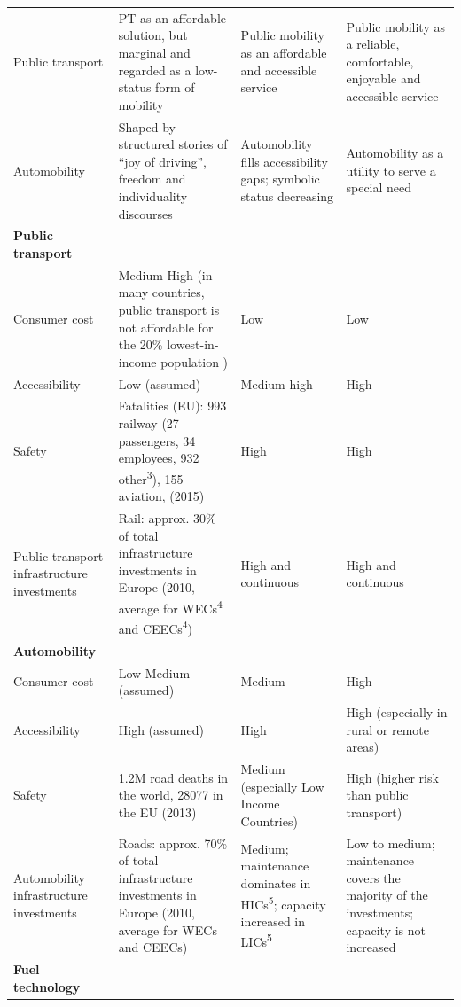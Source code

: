 \begin{longtable}{p{2.5cm}p{4.5cm}p{4cm}p{4cm}}
Public transport & PT as an affordable solution, but marginal and regarded as a low-status form of mobility & Public mobility as an affordable and accessible service & Public mobility as a reliable, comfortable, enjoyable and accessible service \\*
Automobility & Shaped by structured stories of ``joy of driving'', freedom and individuality discourses \parencite{gartman2004_ThreeAgesAutomobile,sheller2012_EmergenceNewCultures} & Automobility fills accessibility gaps; symbolic status decreasing & Automobility as a utility to serve a special need \\\addlinespace
\textbf{Public transport} &  &  &  \\*
Consumer cost & Medium-High (in many countries, public transport is not affordable for the 20\% lowest-in-income population \parencite{carruthers2005_AffordabilityPublicTransport}) & Low & Low \\*
Accessibility & Low (assumed) & Medium-high & High \\*
Safety & Fatalities (EU): 993 railway (27 passengers, 34 employees, 932 other\textsuperscript{3}), 155 aviation, (2015) \parencite{eurostat2017_EurostatOnlineDatabase} & High & High \\*
Public transport infrastructure investments & Rail: approx. 30\% of total infrastructure investments in Europe (2010, average for WECs\textsuperscript{4} and CEECs\textsuperscript{4}) \parencite{kauppila2012_OECDCountriesSpend} & High and continuous & High and continuous \\\addlinespace
\textbf{Automobility} &  &  &  \\*
Consumer cost & Low-Medium (assumed) & Medium & High \\*
Accessibility & High (assumed) & High & High (especially in rural or remote areas) \\*
Safety & 1.2M road deaths in the world, 28077 in the EU (2013) \parencite{who2017_GlobalHealthObservatory} & Medium (especially Low Income Countries) & High (higher risk than public transport) \\*
Automobility infrastructure investments & Roads: approx. 70\% of total infrastructure investments in Europe (2010, average for WECs and CEECs) \parencite{kauppila2012_OECDCountriesSpend} & Medium; maintenance dominates in HICs\textsuperscript{5}; capacity increased in LICs\textsuperscript{5} & Low to medium; maintenance covers the majority of the investments; capacity is not increased \\\addlinespace
\textbf{Fuel technology} &  &  &  \\*

\end{longtable}

